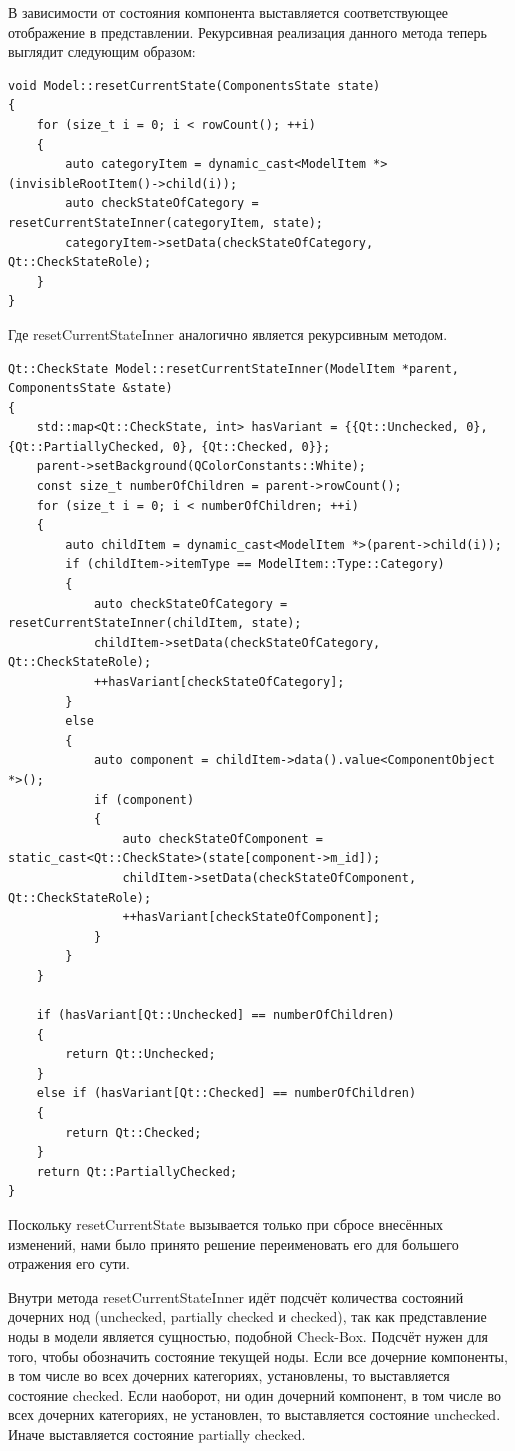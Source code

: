 \documentclass[bachelor, och, pract]{SCWorks}
\begin{document}
В зависимости от состояния компонента выставляется соответствующее отображение в представлении.
Рекурсивная реализация данного метода теперь выглядит следующим образом:

\begin{verbatim}
void Model::resetCurrentState(ComponentsState state)
{
    for (size_t i = 0; i < rowCount(); ++i)
    {
        auto categoryItem = dynamic_cast<ModelItem *>(invisibleRootItem()->child(i));
        auto checkStateOfCategory = resetCurrentStateInner(categoryItem, state);
        categoryItem->setData(checkStateOfCategory, Qt::CheckStateRole);
    }
}
\end{verbatim}

Где resetCurrentStateInner аналогично является рекурсивным методом.

\begin{verbatim}
Qt::CheckState Model::resetCurrentStateInner(ModelItem *parent, ComponentsState &state)
{
    std::map<Qt::CheckState, int> hasVariant = {{Qt::Unchecked, 0}, {Qt::PartiallyChecked, 0}, {Qt::Checked, 0}};
    parent->setBackground(QColorConstants::White);
    const size_t numberOfChildren = parent->rowCount();
    for (size_t i = 0; i < numberOfChildren; ++i)
    {
        auto childItem = dynamic_cast<ModelItem *>(parent->child(i));
        if (childItem->itemType == ModelItem::Type::Category)
        {
            auto checkStateOfCategory = resetCurrentStateInner(childItem, state);
            childItem->setData(checkStateOfCategory, Qt::CheckStateRole);
            ++hasVariant[checkStateOfCategory];
        }
        else
        {
            auto component = childItem->data().value<ComponentObject *>();
            if (component)
            {
                auto checkStateOfComponent = static_cast<Qt::CheckState>(state[component->m_id]); 
                childItem->setData(checkStateOfComponent, Qt::CheckStateRole);
                ++hasVariant[checkStateOfComponent];
            }
        }
    }

    if (hasVariant[Qt::Unchecked] == numberOfChildren)
    {
        return Qt::Unchecked;
    }
    else if (hasVariant[Qt::Checked] == numberOfChildren)
    {
        return Qt::Checked;
    }
    return Qt::PartiallyChecked;
}
\end{verbatim}

Поскольку resetCurrentState вызывается только при сбросе внесённых изменений, нами было принято решение переименовать его для большего отражения его сути.

Внутри метода resetCurrentStateInner идёт подсчёт количества состояний дочерних нод (unchecked, partially checked и checked), так как представление ноды в модели является сущностью, подобной Check-Box.
Подсчёт нужен для того, чтобы обозначить состояние текущей ноды.
Если все дочерние компоненты, в том числе во всех дочерних категориях, установлены, то выставляется состояние checked.
Если наоборот, ни один дочерний компонент, в том числе во всех дочерних категориях, не установлен, то выставляется состояние unchecked.
Иначе выставляется состояние partially checked.
\end{document}
